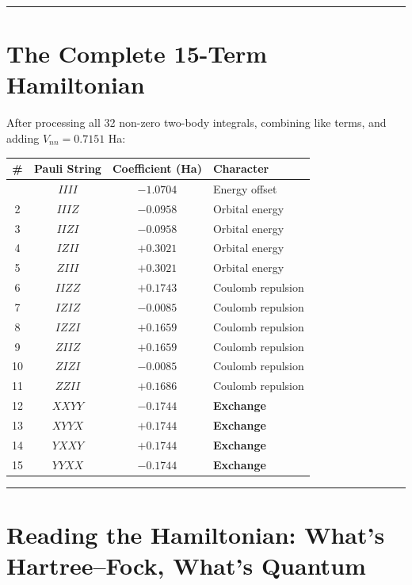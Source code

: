 \documentclass[
  11pt,
  oneside]{book}
\begin{document}
\begin{center}\rule{0.5\linewidth}{0.5pt}\end{center}

\section{The Complete 15-Term
Hamiltonian}\label{the-complete-15-term-hamiltonian}

After processing all 32 non-zero two-body integrals, combining like
terms, and adding \(V_{nn} = 0.7151\) Ha:

\begin{longtable}[]{@{}cccl@{}}
\toprule\noalign{}
\# & Pauli String & Coefficient (Ha) & Character \\
\midrule\noalign{}
\endhead
\bottomrule\noalign{}
\endlastfoot
1 & \(IIII\) & \(-1.0704\) & Energy offset \\
2 & \(IIIZ\) & \(-0.0958\) & Orbital energy \\
3 & \(IIZI\) & \(-0.0958\) & Orbital energy \\
4 & \(IZII\) & \(+0.3021\) & Orbital energy \\
5 & \(ZIII\) & \(+0.3021\) & Orbital energy \\
6 & \(IIZZ\) & \(+0.1743\) & Coulomb repulsion \\
7 & \(IZIZ\) & \(-0.0085\) & Coulomb repulsion \\
8 & \(IZZI\) & \(+0.1659\) & Coulomb repulsion \\
9 & \(ZIIZ\) & \(+0.1659\) & Coulomb repulsion \\
10 & \(ZIZI\) & \(-0.0085\) & Coulomb repulsion \\
11 & \(ZZII\) & \(+0.1686\) & Coulomb repulsion \\
12 & \(XXYY\) & \(-0.1744\) & \textbf{Exchange} \\
13 & \(XYYX\) & \(+0.1744\) & \textbf{Exchange} \\
14 & \(YXXY\) & \(+0.1744\) & \textbf{Exchange} \\
15 & \(YYXX\) & \(-0.1744\) & \textbf{Exchange} \\
\end{longtable}

\begin{center}\rule{0.5\linewidth}{0.5pt}\end{center}

\section{Reading the Hamiltonian: What's Hartree--Fock, What's
Quantum}\label{reading-the-hamiltonian-whats-hartreefock-whats-quantum}
\end{document}

